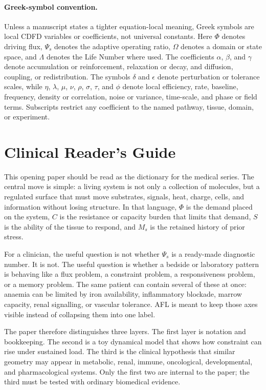 \documentclass[11pt]{article}
\begin{document}
\paragraph{Greek-symbol convention.}
Unless a manuscript states a tighter equation-local meaning, Greek symbols are local CDFD variables or coefficients, not universal constants. Here $\Phi$ denotes driving flux, $\Psi_s$ denotes the adaptive operating ratio, $\Omega$ denotes a domain or state space, and $\Lambda$ denotes the Life Number where used. The coefficients $\alpha$, $\beta$, and $\gamma$ denote accumulation or reinforcement, relaxation or decay, and diffusion, coupling, or redistribution. The symbols $\delta$ and $\epsilon$ denote perturbation or tolerance scales, while $\eta$, $\lambda$, $\mu$, $\nu$, $\rho$, $\sigma$, $\tau$, and $\phi$ denote local efficiency, rate, baseline, frequency, density or correlation, noise or variance, time-scale, and phase or field terms. Subscripts restrict any coefficient to the named pathway, tissue, domain, or experiment.

\section*{Clinical Reader's Guide}
This opening paper should be read as the dictionary for the medical series. The central move is simple: a living system is not only a collection of molecules, but a regulated surface that must move substrates, signals, heat, charge, cells, and information without losing structure. In that language, $\Phi$ is the demand placed on the system, $C$ is the resistance or capacity burden that limits that demand, $S$ is the ability of the tissue to respond, and $M_s$ is the retained history of prior stress.

For a clinician, the useful question is not whether $\Psi_s$ is a ready-made diagnostic number. It is not. The useful question is whether a bedside or laboratory pattern is behaving like a flux problem, a constraint problem, a responsiveness problem, or a memory problem. The same patient can contain several of these at once: anaemia can be limited by iron availability, inflammatory blockade, marrow capacity, renal signalling, or vascular tolerance. AFL is meant to keep those axes visible instead of collapsing them into one label.

The paper therefore distinguishes three layers. The first layer is notation and bookkeeping. The second is a toy dynamical model that shows how constraint can rise under sustained load. The third is the clinical hypothesis that similar geometry may appear in metabolic, renal, immune, oncological, developmental, and pharmacological systems. Only the first two are internal to the paper; the third must be tested with ordinary biomedical evidence.
\end{document}
